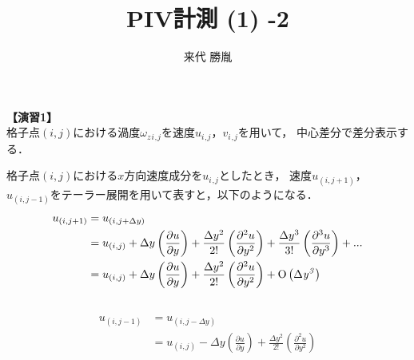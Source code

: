 \documentclass[12pt,a4paper]{jsarticle}
\author{来代 勝胤}
\title{PIV計測 (1) -2}
\begin{document}
\maketitle
\thispagestyle{empty}
\clearpage
\addtocounter{page}{-1}


\begin{flushleft}
    {\large \textbf{【演習1】}\\
        格子点$\left(i,j\right)$における渦度$\omega_z$$_i$$_,$$_j$を速度$u$$_i$$_,$$_j$，$v$$_i$$_,$$_j$を用いて，
        中心差分で差分表示する．\\
    }
\end{flushleft}
格子点$\left(i,j\right)$における$x$方向速度成分を$u$$_i$$_,$$_j$としたとき，
            速度$u _{\left( i,j+1 \right)}$，$u _{\left( i,j-1 \right)}$をテーラー展開を用いて表すと，以下のようになる．\\
            \begin{eqnarray}
                \begin{aligned}
                    u_{\left( i , j+1 \right)}
                     & = u_{\left( i, j+\Delta y \right)}                                                 \\
                     & = u_{\left( i , j \right)} + \Delta y \left( \frac{\partial u}{\partial y} \right)
                    + \frac{\Delta y^2}{2!} \left( \frac{\partial^2 u}{\partial y^2}\right)
                    + \frac{\Delta y^3}{3!} \left( \frac{\partial^3 u}{\partial y^3}\right) + ...         \\
                     & = u_{\left( i , j \right)}
                    + \Delta y \left( \frac{\partial u}{\partial y} \right)
                    + \frac{\Delta y^2}{2!} \left( \frac{\partial^2 u}{\partial y^2}\right)
                    + \rm{O}\left( \Delta \it{y^3} \right)
                \end{aligned}
            \end{eqnarray}
            \\
            \begin{eqnarray}
                \begin{aligned}
                    u_{\left( i , j-1 \right)}
                     & = u_{\left( i, j-\Delta y \right)}                                                 \\
                     & = u_{\left( i , j \right)} - \Delta y \left( \frac{\partial u}{\partial y} \right)
                    + \frac{\Delta y^2}{2!} \left( \frac{\partial^2 u}{\partial y^2}\right)

\end{aligned}
\end{eqnarray}$$
\end{document}

